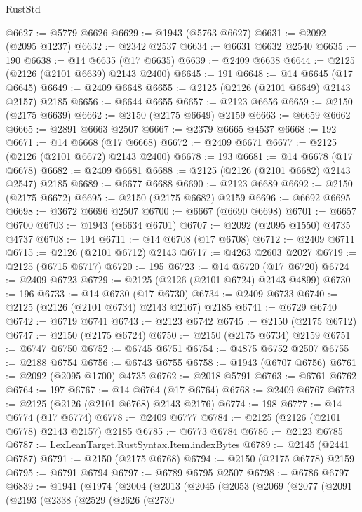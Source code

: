 \begin{lexlean}{RustStd}
\begin{coremodule}
@6627 := @5779 @6626
@6629 := @1943 (@5763 @6627)
@6631 := @2092 (@2095 @1237)
@6632 := @2342 @2537
@6634 := @6631 @6632 @2540
@6635 := 190
@6638 := @14 @6635 (@17 @6635)
@6639 := @2409 @6638
@6644 := @2125 (@2126 (@2101 @6639) @2143 @2400)
@6645 := 191
@6648 := @14 @6645 (@17 @6645)
@6649 := @2409 @6648
@6655 := @2125 (@2126 (@2101 @6649) @2143 @2157) @2185
@6656 := @6644 @6655
@6657 := @2123 @6656
@6659 := @2150 (@2175 @6639)
@6662 := @2150 (@2175 @6649) @2159
@6663 := @6659 @6662
@6665 := @2891 @6663 @2507
@6667 := @2379 @6665 @4537
@6668 := 192
@6671 := @14 @6668 (@17 @6668)
@6672 := @2409 @6671
@6677 := @2125 (@2126 (@2101 @6672) @2143 @2400)
@6678 := 193
@6681 := @14 @6678 (@17 @6678)
@6682 := @2409 @6681
@6688 := @2125 (@2126 (@2101 @6682) @2143 @2547) @2185
@6689 := @6677 @6688
@6690 := @2123 @6689
@6692 := @2150 (@2175 @6672)
@6695 := @2150 (@2175 @6682) @2159
@6696 := @6692 @6695
@6698 := @3672 @6696 @2507
@6700 := @6667 (@6690 @6698)
@6701 := @6657 @6700
@6703 := @1943 (@6634 @6701)
@6707 := @2092 (@2095 @1550) @4735 @4737
@6708 := 194
@6711 := @14 @6708 (@17 @6708)
@6712 := @2409 @6711
@6715 := @2126 (@2101 @6712) @2143
@6717 := @4263 @2603 @2027
@6719 := @2125 (@6715 @6717)
@6720 := 195
@6723 := @14 @6720 (@17 @6720)
@6724 := @2409 @6723
@6729 := @2125 (@2126 (@2101 @6724) @2143 @4899)
@6730 := 196
@6733 := @14 @6730 (@17 @6730)
@6734 := @2409 @6733
@6740 := @2125 (@2126 (@2101 @6734) @2143 @2167) @2185
@6741 := @6729 @6740
@6742 := @6719 @6741
@6743 := @2123 @6742
@6745 := @2150 (@2175 @6712)
@6747 := @2150 (@2175 @6724)
@6750 := @2150 (@2175 @6734) @2159
@6751 := @6747 @6750
@6752 := @6745 @6751
@6754 := @4875 @6752 @2507
@6755 := @2188 @6754
@6756 := @6743 @6755
@6758 := @1943 (@6707 @6756)
@6761 := @2092 (@2095 @1700) @4735
@6762 := @2018 @5791
@6763 := @6761 @6762
@6764 := 197
@6767 := @14 @6764 (@17 @6764)
@6768 := @2409 @6767
@6773 := @2125 (@2126 (@2101 @6768) @2143 @2176)
@6774 := 198
@6777 := @14 @6774 (@17 @6774)
@6778 := @2409 @6777
@6784 := @2125 (@2126 (@2101 @6778) @2143 @2157) @2185
@6785 := @6773 @6784
@6786 := @2123 @6785
@6787 := LexLeanTarget.RustSyntax.Item.indexBytes
@6789 := @2145 (@2441 @6787)
@6791 := @2150 (@2175 @6768)
@6794 := @2150 (@2175 @6778) @2159
@6795 := @6791 @6794
@6797 := @6789 @6795 @2507
@6798 := @6786 @6797
@6839 := @1941
    (@1974
      (@2004
        (@2013
          (@2045
            (@2053
              (@2069
                (@2077
                  (@2091
                    (@2193
                      (@2338
                        (@2529
                          (@2626
                            (@2730

\end{coremodule}
\end{lexlean}

